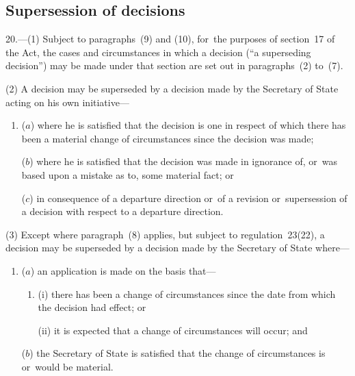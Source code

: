 \documentclass[a4paper,12pt]{article}
\begin{document}
\subsection[20. Supersession of decisions]{Supersession of decisions}

20.—(1) Subject to paragraphs~(9) and (10), for~the purposes of section~17 of the Act, the cases and circumstances in which a decision (“a superseding decision”) may be made under that section are set out in paragraphs~(2) to~(7).

(2) A decision may be superseded by a decision made by the Secretary of State acting on his own initiative---
\begin{enumerate}\item[]
($a$) where he is satisfied that the decision is one in respect of which there has been a material change of circumstances since the decision was made;

($b$) where he is satisfied that the decision was made in ignorance of, or~was based upon a mistake as to, some material fact; or

($c$) in consequence of a departure direction or~of a revision or~supersession of a decision with respect to a departure direction.
\end{enumerate}

(3) Except where paragraph~(8) applies, 
but subject to regulation~23(22),  %
a decision may be superseded by a decision made by the Secretary of State where---
\begin{enumerate}\item[]
($a$) an application is made on the basis that---
\begin{enumerate}\item[]
(i) there has been a change of circumstances 
since the date from which the decision had effect;  %
or

(ii) it is expected that a change of circumstances will occur; and
\end{enumerate}

($b$) the Secretary of State is satisfied that the change of circumstances is or~would be material.
\end{enumerate}
\end{document}
